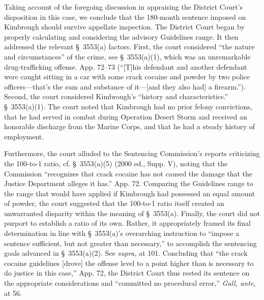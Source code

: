{{  Taking account of the foregoing discussion in appraising the District
Court's disposition in this case, we conclude that the 180-month
sentence imposed on Kimbrough should survive appellate inspection.
The District Court began by properly calculating and considering the
advisory Guidelines range. It then addressed the relevant \S~3553(a)
factors. First, the court considered ``the nature and circumstances''
of the crime, see \S~3553(a)(1), which was an unremarkable
drug-trafficking offense. App. 72--73 (``[T]his defendant and another
defendant were caught sitting in a car with some crack cocaine and
powder by two police officers---that's the sum and substance of
it---[and they also had] a firearm.''). Second, the court considered
Kimbrough's ``history and characteristics.'' \S~3553(a)(1). The
court noted that Kimbrough had no prior felony convictions, that he had
served in combat during Operation Desert Storm and received an honorable
discharge from the Marine Corps, and that he had a steady history of
employment.

  Furthermore, the court alluded to the Sentencing Commission's
reports criticizing the 100-to-1 ratio, cf. \S~3553(a)(5) (2000
ed., Supp. V), noting that the Commission ``recognizes that crack
cocaine has not caused the damage that the Justice Department alleges
it has.'' App. 72. Comparing the Guidelines range to the range
that would have applied if Kimbrough had possessed an equal amount of
powder, the \newpage  court suggested that the 100-to-1 ratio itself
created an unwarranted disparity within the meaning of \S~3553(a).
Finally, the court did not purport to establish a ratio of its own.
Rather, it appropriately framed its final determination in line with
\S~3553(a)'s overarching instruction to ``impose a sentence
sufficient, but not greater than necessary,'' to accomplish the
sentencing goals advanced in \S~3553(a)(2). See \emph{supra,} at
101. Concluding that ``the crack cocaine guidelines [drove] the
offense level to a point higher than is necessary to do justice in this
case,'' App. 72, the District Court thus rested its sentence on
the appropriate considerations and ``committed no procedural error,''
\emph{Gall, ante,} at 56.

}}
